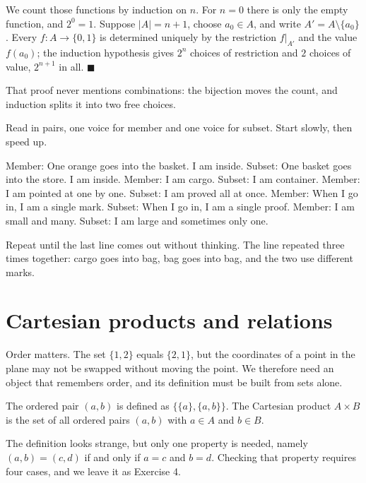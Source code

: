 We count those functions by induction on $n$. For $n = 0$ there is only the empty
function, and $2^{0} = 1$. Suppose $|A| = n+1$, choose $a_0 \in A$, and write
$A' = A \setminus \{a_0\}$. Every $f : A \to \{0,1\}$ is determined uniquely by the
restriction $f|_{A'}$ and the value $f(a_0)$; the induction hypothesis gives $2^{n}$
choices of restriction and $2$ choices of value, $2^{n+1}$ in all.
\hfill$\blacksquare${\parfillskip=0pt\par}

That proof never mentions combinations: the bijection moves the count, and induction
splits it into two free choices.

\begin{bacakeras}
Read in pairs, one voice for member and one voice for subset. Start slowly, then
speed up.

Member: One orange goes into the basket. I am inside.
Subset: One basket goes into the store. I am inside.
Member: I am cargo.
Subset: I am container.
Member: I am pointed at one by one.
Subset: I am proved all at once.
Member: When I go in, I am a single mark.
Subset: When I go in, I am a single proof.
Member: I am small and many.
Subset: I am large and sometimes only one.

Repeat until the last line comes out without thinking. The line repeated three times
together: cargo goes into bag, bag goes into bag, and the two use different marks.
\end{bacakeras}

\section{Cartesian products and relations}

Order matters. The set $\{1,2\}$ equals $\{2,1\}$, but the coordinates of a point in
the plane may not be swapped without moving the point. We therefore need an object
that remembers order, and its definition must be built from sets alone.

\begin{definisi}
The ordered pair $(a,b)$ is defined as $\{\{a\}, \{a,b\}\}$. The Cartesian product
$A \times B$ is the set of all ordered pairs $(a,b)$ with $a \in A$ and $b \in B$.
\end{definisi}

The definition looks strange, but only one property is needed, namely
$(a,b) = (c,d)$ if and only if $a = c$ and $b = d$. Checking that property requires
four cases, and we leave it as Exercise 4.

